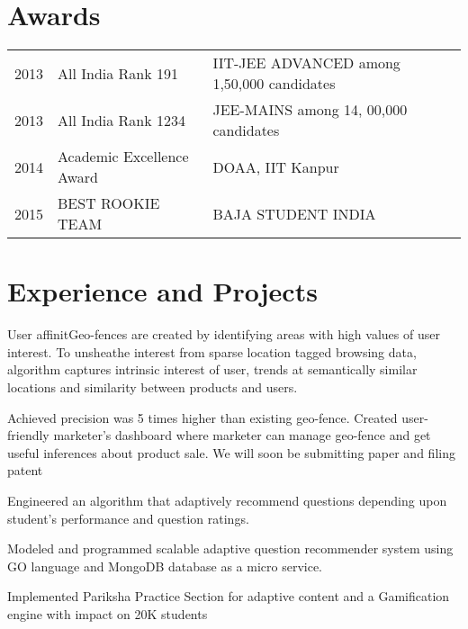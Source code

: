 \documentclass[]{deedy-resume-openfont}
\begin{document}
\hfill
\begin{minipage}[t]{0.66\textwidth} 


\section{Awards} 
\begin{tabular}{rll}
	2013 & All India Rank 191 & IIT-JEE ADVANCED among 1,50,000 candidates \\
	2013 & All India Rank 1234 & JEE-MAINS among 14, 00,000 candidates \\ 
	2014 & Academic Excellence Award & DOAA, IIT Kanpur \\
	2015 & BEST ROOKIE TEAM  & BAJA STUDENT INDIA \\ 
\end{tabular}
\sectionsep

\section{Experience and Projects}

\vspace{\topsep} %
\begin{tightemize}
\item User affinitGeo-fences are created by identifying areas with high values of user interest. To unsheathe interest from sparse location tagged browsing data, algorithm captures intrinsic interest of user, trends at semantically similar locations and similarity between products and users.

\item Achieved precision was 5 times higher than existing geo-fence. Created user-friendly marketer’s dashboard where marketer can manage geo-fence and get useful inferences about product sale. We will soon be submitting paper and filing patent
\end{tightemize}
\sectionsep

\begin{tightemize}
\item Engineered an algorithm that adaptively recommend questions depending upon student’s performance and question ratings.
\item Modeled and programmed scalable adaptive question recommender system using GO language and MongoDB database as a micro service.
\item Implemented Pariksha Practice Section for adaptive content and a Gamification engine with impact on 20K students
\end{tightemize}


\end{minipage}
\end{document}
